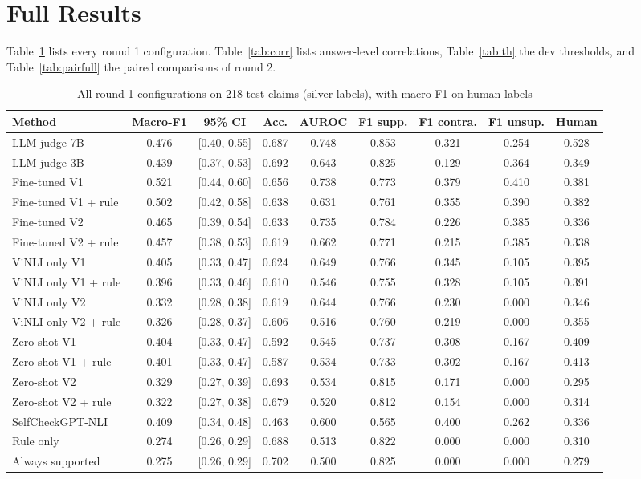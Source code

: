 \documentclass[conference]{IEEEtran}
\begin{document}
\section{Full Results}
Table~\ref{tab:full} lists every round 1 configuration. Table~\ref{tab:corr} lists answer-level correlations, Table~\ref{tab:th} the dev thresholds, and Table~\ref{tab:pairfull} the paired comparisons of round 2.

\begin{table}[t]
\caption{All round 1 configurations on 218 test claims (silver labels), with macro-F1 on human labels}
\label{tab:full}
\centering
\footnotesize
\begin{tabular}{lcccccccc}
\toprule
Method & Macro-F1 & 95\% CI & Acc. & AUROC & F1 supp. & F1 contra. & F1 unsup. & Human \\
\midrule
LLM-judge 7B & 0.476 & [0.40, 0.55] & 0.687 & 0.748 & 0.853 & 0.321 & 0.254 & 0.528 \\
LLM-judge 3B & 0.439 & [0.37, 0.53] & 0.692 & 0.643 & 0.825 & 0.129 & 0.364 & 0.349 \\
Fine-tuned V1 & 0.521 & [0.44, 0.60] & 0.656 & 0.738 & 0.773 & 0.379 & 0.410 & 0.381 \\
Fine-tuned V1 + rule & 0.502 & [0.42, 0.58] & 0.638 & 0.631 & 0.761 & 0.355 & 0.390 & 0.382 \\
Fine-tuned V2 & 0.465 & [0.39, 0.54] & 0.633 & 0.735 & 0.784 & 0.226 & 0.385 & 0.336 \\
Fine-tuned V2 + rule & 0.457 & [0.38, 0.53] & 0.619 & 0.662 & 0.771 & 0.215 & 0.385 & 0.338 \\
ViNLI only V1 & 0.405 & [0.33, 0.47] & 0.624 & 0.649 & 0.766 & 0.345 & 0.105 & 0.395 \\
ViNLI only V1 + rule & 0.396 & [0.33, 0.46] & 0.610 & 0.546 & 0.755 & 0.328 & 0.105 & 0.391 \\
ViNLI only V2 & 0.332 & [0.28, 0.38] & 0.619 & 0.644 & 0.766 & 0.230 & 0.000 & 0.346 \\
ViNLI only V2 + rule & 0.326 & [0.28, 0.37] & 0.606 & 0.516 & 0.760 & 0.219 & 0.000 & 0.355 \\
Zero-shot V1 & 0.404 & [0.33, 0.47] & 0.592 & 0.545 & 0.737 & 0.308 & 0.167 & 0.409 \\
Zero-shot V1 + rule & 0.401 & [0.33, 0.47] & 0.587 & 0.534 & 0.733 & 0.302 & 0.167 & 0.413 \\
Zero-shot V2 & 0.329 & [0.27, 0.39] & 0.693 & 0.534 & 0.815 & 0.171 & 0.000 & 0.295 \\
Zero-shot V2 + rule & 0.322 & [0.27, 0.38] & 0.679 & 0.520 & 0.812 & 0.154 & 0.000 & 0.314 \\
SelfCheckGPT-NLI & 0.409 & [0.34, 0.48] & 0.463 & 0.600 & 0.565 & 0.400 & 0.262 & 0.336 \\
Rule only & 0.274 & [0.26, 0.29] & 0.688 & 0.513 & 0.822 & 0.000 & 0.000 & 0.310 \\
Always supported & 0.275 & [0.26, 0.29] & 0.702 & 0.500 & 0.825 & 0.000 & 0.000 & 0.279 \\
\bottomrule
\end{tabular}
\end{table}
\end{document}
